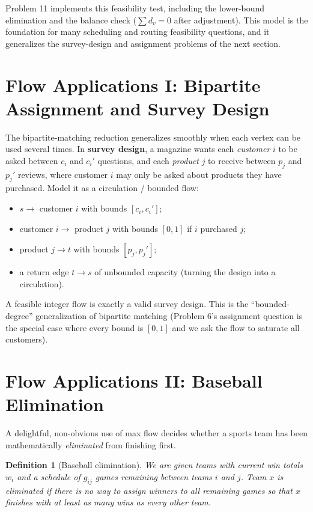 \documentclass[11pt]{article}
\newtheorem{definition}[theorem]{Definition}
\begin{document}
Problem 11 implements this feasibility test, including the lower-bound
elimination and the balance check ($\sum d_v = 0$ after adjustment). This model
is the foundation for many scheduling and routing feasibility questions, and it
generalizes the survey-design and assignment problems of the next section.

\section{Flow Applications I: Bipartite Assignment and Survey Design}

The bipartite-matching reduction generalizes smoothly when each vertex can be
used several times. In \textbf{survey design}, a magazine wants each
\emph{customer} $i$ to be asked between $c_i$ and $c_i'$ questions, and each
\emph{product} $j$ to receive between $p_j$ and $p_j'$ reviews, where customer
$i$ may only be asked about products they have purchased. Model it as a
circulation / bounded flow:
\begin{itemize}
    \item $s \to$ customer $i$ with bounds $[c_i, c_i']$;
    \item customer $i \to$ product $j$ with bounds $[0,1]$ if $i$ purchased $j$;
    \item product $j \to t$ with bounds $[p_j, p_j']$;
    \item a return edge $t \to s$ of unbounded capacity (turning the design into
    a circulation).
\end{itemize}
A feasible integer flow is exactly a valid survey design. This is the
``bounded-degree'' generalization of bipartite matching (Problem 6's assignment
question is the special case where every bound is $[0,1]$ and we ask the flow to
saturate all customers).

\section{Flow Applications II: Baseball Elimination}

A delightful, non-obvious use of max flow decides whether a sports team has been
mathematically \emph{eliminated} from finishing first.

\begin{definition}[Baseball elimination]
We are given teams with current win totals $w_i$ and a schedule of $g_{ij}$
games \emph{remaining} between teams $i$ and $j$. Team $x$ is \emph{eliminated}
if there is \emph{no} way to assign winners to all remaining games so that $x$
finishes with at least as many wins as every other team.
\end{definition}
\end{document}
